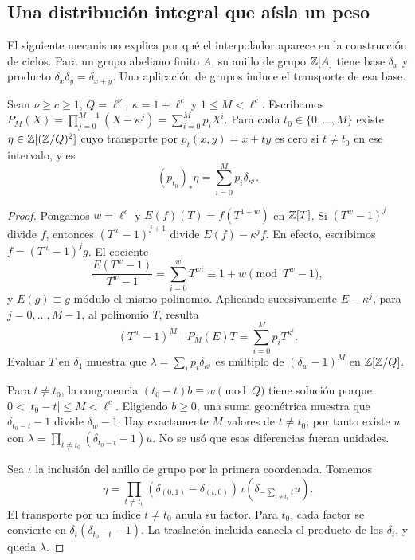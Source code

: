 \subsection{Una distribución integral que aísla un peso}

El siguiente mecanismo explica por qué el interpolador aparece
en la construcción de ciclos. Para un grupo abeliano finito $A$,
su anillo de grupo $\mathbb{Z}[A]$ tiene base $\delta_x$ y producto
$\delta_x\delta_y=\delta_{x+y}$. Una aplicación de grupos induce
el transporte de esa base.

\begin{lema}
\label{lem:cf-distribucion}
Sean $\nu\ge c\ge1$, $Q=\ell^\nu$, $\kappa=1+\ell^c$ y
$1\le M<\ell^c$. Escribamos
$P_M(X)=\prod_{j=0}^{M-1}(X-\kappa^j)=\sum_{i=0}^Mp_iX^i$.
Para cada $t_0\in\{0,\ldots,M\}$ existe
$\eta\in\mathbb{Z}[(\mathbb{Z}/Q)^2]$ cuyo transporte por
$p_t(x,y)=x+ty$ es cero si $t\ne t_0$ en ese intervalo, y es
\begin{equation}
 (p_{t_0})_*\eta=\sum_{i=0}^Mp_i\delta_{\kappa^i}.
 \label{eq:cf-distribucion}
\end{equation}
\end{lema}

\begin{proof}
Pongamos $w=\ell^c$ y $E(f)(T)=f(T^{1+w})$ en $\mathbb{Z}[T]$.
Si $(T^w-1)^j$ divide $f$, entonces $(T^w-1)^{j+1}$ divide
$E(f)-\kappa^jf$. En efecto, escribimos
$f=(T^w-1)^jg$. El cociente
\[
 \frac{E(T^w-1)}{T^w-1}=\sum_{i=0}^{w}T^{wi}
 \equiv1+w\pmod{T^w-1},
\]
y $E(g)\equiv g$ módulo el mismo polinomio.
Aplicando sucesivamente $E-\kappa^j$, para $j=0,\ldots,M-1$,
al polinomio $T$, resulta
\[
 (T^w-1)^M\mid P_M(E)T=\sum_{i=0}^Mp_iT^{\kappa^i}.
\]
Evaluar $T$ en $\delta_1$ muestra que
$\lambda=\sum_i p_i\delta_{\kappa^i}$ es múltiplo de
$(\delta_w-1)^M$ en $\mathbb{Z}[\mathbb{Z}/Q]$.

Para $t\ne t_0$, la congruencia $(t_0-t)b\equiv w\pmod Q$
tiene solución porque $0<|t_0-t|\le M<\ell^c$.
Eligiendo $b\ge0$, una suma geométrica muestra que
$\delta_{t_0-t}-1$ divide $\delta_w-1$.
Hay exactamente $M$ valores de $t\ne t_0$; por tanto existe $u$
con $\lambda=\prod_{t\ne t_0}(\delta_{t_0-t}-1)u$.
No se usó que esas diferencias fueran unidades.

Sea $\iota$ la inclusión del anillo de grupo por la primera
coordenada. Tomemos
\[
 \eta=\prod_{t\ne t_0}(\delta_{(0,1)}-\delta_{(t,0)})\,
 \iota\!\left(\delta_{-\sum_{t\ne t_0}t}u\right).
\]
El transporte por un índice $t\ne t_0$ anula su factor.
Para $t_0$, cada factor se convierte en
$\delta_t(\delta_{t_0-t}-1)$. La traslación incluida cancela
el producto de los $\delta_t$, y queda $\lambda$.
\end{proof}

